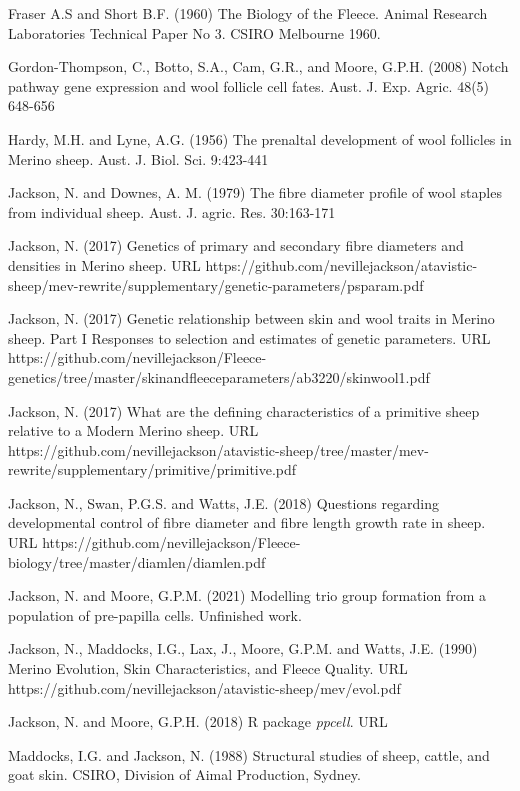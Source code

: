 \documentclass[titlepage]{article}  %
\begin{document}
\begin{thebibliography}{}
Fraser A.S and Short B.F. (1960) The Biology of the Fleece. Animal Research Laboratories Technical Paper No 3. CSIRO Melbourne 1960.

Gordon-Thompson, C., Botto, S.A., Cam, G.R., and Moore, G.P.H. (2008) Notch pathway gene expression and wool follicle cell fates. Aust. J. Exp. Agric. 48(5) 648-656

Hardy, M.H. and Lyne, A.G. (1956) The prenaltal development of wool follicles in Merino sheep. Aust. J. Biol. Sci. 9:423-441

Jackson, N. and Downes, A. M. (1979) The fibre diameter profile of wool staples from individual sheep. Aust. J. agric. Res. 30:163-171

Jackson, N. (2017) Genetics of primary and secondary fibre diameters and densities in Merino sheep. URL https://github.com/nevillejackson/atavistic-sheep/mev-rewrite/supplementary/genetic-parameters/psparam.pdf

Jackson, N. (2017) Genetic relationship between skin and wool traits in Merino sheep. Part I Responses to selection and estimates of genetic parameters. URL https://github.com/nevillejackson/Fleece-genetics/tree/master/skinandfleeceparameters/ab3220/skinwool1.pdf

Jackson, N. (2017) What are the defining characteristics of a primitive sheep relative to a Modern Merino sheep.  URL https://github.com/nevillejackson/atavistic-sheep/tree/master/mev-rewrite/supplementary/primitive/primitive.pdf

Jackson, N., Swan, P.G.S. and Watts, J.E. (2018) Questions regarding developmental control of fibre diameter and fibre length growth rate in sheep. URL https://github.com/nevillejackson/Fleece-biology/tree/master/diamlen/diamlen.pdf

Jackson, N. and Moore, G.P.M. (2021) Modelling trio group formation from a population of pre-papilla cells. Unfinished work.

Jackson, N., Maddocks, I.G., Lax, J., Moore, G.P.M. and Watts, J.E. (1990) Merino Evolution, Skin Characteristics, and Fleece Quality. URL https://github.com/nevillejackson/atavistic-sheep/mev/evol.pdf 

Jackson, N. and Moore, G.P.H. (2018) R package {\em ppcell}. URL

Maddocks, I.G. and Jackson, N. (1988) Structural studies of sheep, cattle, and goat skin. CSIRO, Division of Aimal Production, Sydney.


\end{thebibliography}
\end{document}
